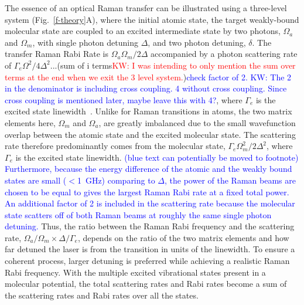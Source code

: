 \documentclass[aps,prl,twocolumn,groupedaddress]{revtex4-1}
\begin{document}
The essence of an optical Raman transfer can be illustrated using a three-level system (Fig.~\ref{f-theory}A), where the initial atomic state, the target weakly-bound molecular state are coupled to an excited intermediate state by two photons, $\Omega_a$ and $\Omega_m$, with single photon detuning $ \Delta $, and two photon detuning, $ \delta$.  %
The transfer Raman Rabi Rate is $ \Omega_a\Omega_m / 2\Delta$ accompanied by a photon scattering rate of $\Gamma_e \Omega^2 / 4\Delta^2$...(sum of i terms\textcolor{red}{KW: I was intending to only mention the sum over terms at the end when we exit the 3 level system.})\textcolor{blue}{check factor of 2. KW: The 2 in the denominator is including cross coupling. 4 without cross coupling. Since cross coupling is mentioned later, maybe leave this with 4?}, where $ \Gamma_e $ is the excited state linewidth~\cite{Wineland2003}. %
Unlike for Raman transitions in atoms, the two matrix elements here, $ \Omega_m$ and $ \Omega_a$, are greatly imbalanced %
due to the small wavefunction overlap between the atomic state and the excited molecular state. The scattering rate therefore predominantly comes from the molecular state, $ \Gamma_e \Omega_m^2 / 2\Delta^2$, where $ \Gamma_e $ is the excited state linewidth. \textcolor{blue}{(blue text can potentially be moved to footnote) Furthermore, because the energy difference of the atomic and the weakly bound states are small ($<$1~GHz) comparing to $\Delta$, the power of the Raman beams are chosen to be equal to gives the largest Raman Rabi rate at a fixed total power. %
  An additional factor of 2 is included in the scattering rate because the molecular state scatters off of both Raman beams at roughly the same single photon detuning. } Thus, the ratio between the Raman Rabi frequency and the scattering rate, $ \Omega_a/\Omega_m \times \Delta/\Gamma_e $, depends on the ratio of the two matrix elements and how far detuned the laser is from the transition in units of the linewidth. To ensure a coherent process, larger detuning is preferred while achieving a realistic Raman Rabi frequency. %
With the multiple excited vibrational states present in a molecular potential, the total scattering rates and Rabi rates become a sum of the scattering rates and Rabi rates over all the states. %
\end{document}
